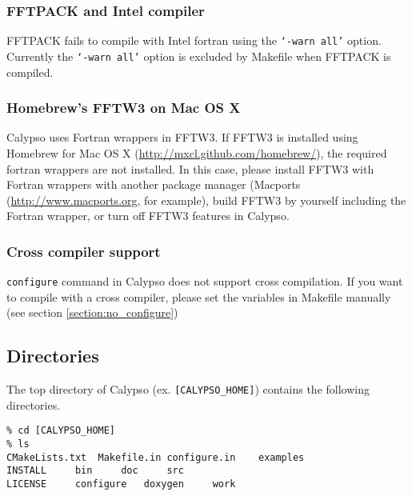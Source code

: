 \subsubsection*{FFTPACK and Intel compiler}
FFTPACK fails to compile with Intel fortran using the {\tt `-warn all'} option. Currently the {\tt `-warn all'} option is excluded by Makefile when FFTPACK is compiled.

\subsubsection*{Homebrew's FFTW3 on Mac OS X}
Calypso uses Fortran wrappers in FFTW3. If FFTW3 is installed using Homebrew for Mac OS X (\url{http://mxcl.github.com/homebrew/}), the required fortran wrappers are not installed. In this case, please install FFTW3 with Fortran wrappers with another package manager (Macports (\url{http://www.macports.org}, for example), build FFTW3 by yourself including the Fortran wrapper, or turn off FFTW3 features in Calypso.
\subsubsection*{Cross compiler support}
{\tt configure} command in Calypso does not support cross compilation. If you want to compile with a cross compiler, please set the variables in Makefile manually (see section \ref{section:no_configure})

\subsection{Directories}

The top directory of Calypso (ex. \verb|[CALYPSO_HOME]|) contains the following directories.
\begin{verbatim}
% cd [CALYPSO_HOME]
% ls
CMakeLists.txt	Makefile.in	configure.in	examples
INSTALL		bin		doc		src
LICENSE		configure	doxygen		work

\end{verbatim}


